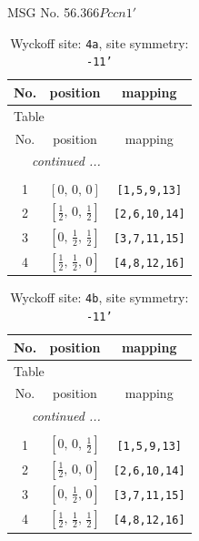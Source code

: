 \documentclass[fleqn,8pt]{jsarticle}
\begin{document}
\setcounter{MaxMatrixCols}{32}

\renewcommand{\tablename}{Table~}
\renewcommand{\figurename}{Figure~}
\begin{center}
\LARGE
MSG No. 56.366\quad$Pccn1'$
\end{center}
\renewcommand{\arraystretch}{1.2}
\begin{longtable}{ccc}
\caption{Wyckoff site: {\tt 4a}, site symmetry: {\tt -11'}}
 \\
 \hline \hline
No. & position & mapping \\ \hline \endfirsthead

\multicolumn{2}{l}{\tablename\ \thetable{}} \\
 \hline \hline
No. & position & mapping \\ \hline \endhead

 \hline \hline
\multicolumn{2}{r}{\footnotesize\it continued ...} \\ \endfoot

 \hline \hline
\multicolumn{2}{r}{} \\ \endlastfoot

1 & $\left[ 0,\, 0,\, 0 \right]$ & {\tt [1,5,9,13]} \\ \hline
2 & $\left[ \frac{1}{2},\, 0,\, \frac{1}{2} \right]$ & {\tt [2,6,10,14]} \\ \hline
3 & $\left[ 0,\, \frac{1}{2},\, \frac{1}{2} \right]$ & {\tt [3,7,11,15]} \\ \hline
4 & $\left[ \frac{1}{2},\, \frac{1}{2},\, 0 \right]$ & {\tt [4,8,12,16]} \\
\end{longtable}
\renewcommand{\arraystretch}{1.2}
\begin{longtable}{ccc}
\caption{Wyckoff site: {\tt 4b}, site symmetry: {\tt -11'}}
 \\
 \hline \hline
No. & position & mapping \\ \hline \endfirsthead

\multicolumn{2}{l}{\tablename\ \thetable{}} \\
 \hline \hline
No. & position & mapping \\ \hline \endhead

 \hline \hline
\multicolumn{2}{r}{\footnotesize\it continued ...} \\ \endfoot

 \hline \hline
\multicolumn{2}{r}{} \\ \endlastfoot

1 & $\left[ 0,\, 0,\, \frac{1}{2} \right]$ & {\tt [1,5,9,13]} \\ \hline
2 & $\left[ \frac{1}{2},\, 0,\, 0 \right]$ & {\tt [2,6,10,14]} \\ \hline
3 & $\left[ 0,\, \frac{1}{2},\, 0 \right]$ & {\tt [3,7,11,15]} \\ \hline
4 & $\left[ \frac{1}{2},\, \frac{1}{2},\, \frac{1}{2} \right]$ & {\tt [4,8,12,16]} \\
\end{longtable}
\end{document}
